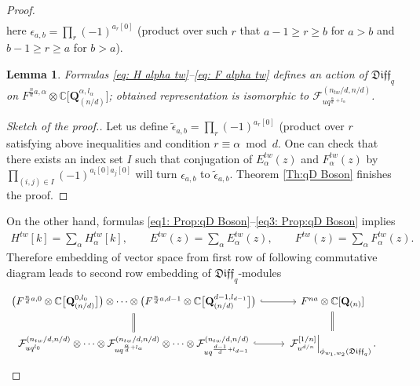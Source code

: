 \documentclass[pdftex]{sigma}
\numberwithin{equation}{section}
\newtheorem{Lemma}[Theorem]{Lemma}
\theoremstyle{definition}
\newcommand{\qD}{\mathfrak{Diff}_q}
\newcommand{\Q}{\mathbf{Q}_{(n)}}
\begin{document}
\begin{proof}
\begin{gather}
\end{gather}
here $\epsilon_{a,b} = \prod_r (-1)^{a_r[0]}$ (product over such $r$ that $a-1 \geqslant r \geqslant b$ for $a>b$ and $b-1 \geqslant r \geqslant a$ for $b>a$).
\begin{Lemma}
Formulas \eqref{eq: H alpha tw}--\eqref{eq: F alpha tw} defines an action of $\qD$ on $F^{\frac{n}{d}a, \alpha} \otimes \mathbb{C}\big[\mathbf{Q}_{(n/d)}^{\alpha, l_{\alpha}}\big]$; obtained representation is isomorphic to $\mathcal{F}_{u q^{ \frac{\alpha}{d} + l_{\alpha}}}^{(n_{tw}/d, n/d)}$.
\end{Lemma}
\begin{proof}[Sketch of the proof.]
Let us define $\tilde{\epsilon}_{a,b}=\prod_r (-1)^{a_r[0]}$ (product over $r$ satisfying above inequalities and condition $r \equiv \alpha \bmod d$. One can check that there exists an index set $I$ such that conjugation of $E^{tw}_{\alpha}(z)$ and $F^{tw}_{\alpha}(z)$ by $\prod\limits_{(i,j) \in I} (-1)^{a_i[0] a_j[0]}$ will turn $\epsilon_{a,b}$ to $\tilde{\epsilon}_{a,b}$. Theorem \ref{Th:qD Boson} finishes the proof.
\end{proof}

On the other hand, formulas \eqref{eq1: Prop:qD Boson}--\eqref{eq3: Prop:qD Boson} implies
\begin{gather*}
H^{tw}[k] = \sum_{\alpha} H_{\alpha}^{tw}[k], \qquad
E^{tw}(z) = \sum_{\alpha} E^{tw}_{\alpha} (z), \qquad F^{tw}(z) = \sum_{\alpha} F^{tw}_{\alpha} (z).
\end{gather*}
Therefore embedding of vector space from first row of following commutative diagram leads to second row embedding of $\qD$-modules
\begin{equation*}
\begin{tikzcd}
\big( F^{\frac{n}{d}a, 0} \otimes \mathbb{C} \big[\mathbf{Q}_{(n/d)}^{0, l_0} \big] \big) \otimes \dots \otimes \big( F^{\frac{n}{d}a, d-1} \otimes \mathbb{C} \big[ \mathbf{Q}_{(n/d)}^{d-1, l_{d-1}} \big] \big) \arrow[d, equal] \arrow[r,hook] &
F^{na}\otimes \mathbb{C} [\Q] \arrow[d, equal]
\\
\mathcal{F}_{u q^{ l_0}}^{(n_{tw}/d, n/d)} \otimes \cdots \otimes \mathcal{F}_{u q^{\frac{\alpha}{d}+ l_{\alpha}
}}^{(n_{tw}/d, n/d)} \otimes \cdots \otimes \mathcal{F}_{u q^{\frac{d-1}{d}+ l_{d-1}}}^{(n_{tw}/d, n/d)} \arrow[r,hook] &
\left. \mathcal{F}^{[1/n]}_{u^{d/n}} \right|_{\phi_{w_1,w_2}(\qD)}.
\end{tikzcd}\tag*{\qed}
\end{equation*}\renewcommand{\qed}{}
\end{proof}
\end{document}
